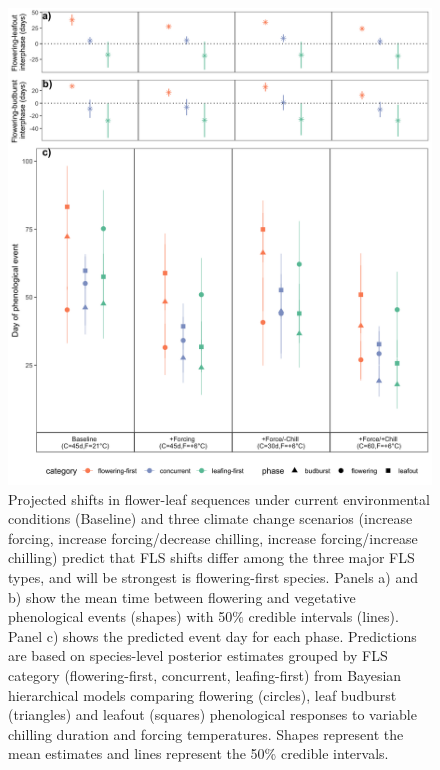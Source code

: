 \documentclass[12pt]{article}\usepackage[]{graphicx}\usepackage[]{color}
\begin{document}
\pagebreak

\begin{figure}[h!]
    \centering
 \includegraphics[width=.9\textwidth]{..//Plots/Flobuds_manuscript_figs/posteriorgroups_go.png} 
    \caption{Projected shifts in flower-leaf sequences under current environmental conditions (Baseline) and three climate change scenarios (increase forcing, increase forcing/decrease chilling, increase forcing/increase chilling) predict that FLS shifts differ among the three major FLS types, and will be strongest is flowering-first species. Panels a) and b) show the mean time between flowering and vegetative phenological events (shapes) with 50\% credible intervals (lines). Panel c) shows the predicted event day for each phase. Predictions are based on species-level posterior estimates grouped by FLS category (flowering-first, concurrent, leafing-first) from Bayesian hierarchical models comparing flowering (circles), leaf budburst (triangles) and leafout (squares) phenological responses to variable chilling duration and forcing temperatures. Shapes represent the mean estimates and lines represent the 50\% credible intervals. }

\end{figure}
\end{document}
